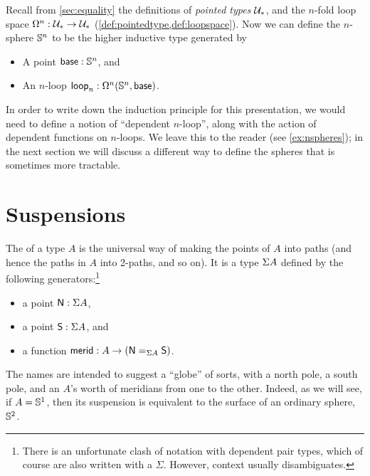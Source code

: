 %
Recall from \autoref{sec:equality} the definitions of \emph{pointed types} $\type_*$, and the $n$-fold loop space $\Omega^n : \type_* \to \type_*$
(\cref{def:pointedtype,def:loopspace}).  Now we can define the
$n$-sphere $\Sn^n$ to be the higher inductive type generated by
%
\begin{itemize}
\item A point $\base:\Sn^n$, and
\item An $n$-loop $\lloop_n : \Omega^n(\Sn^n,\base)$.
\end{itemize}
In order to write down the induction principle for this presentation, we would need to define a notion of ``dependent $n$-loop'', along with the action of dependent functions on $n$-loops.
We leave this to the reader (see \autoref{ex:nspheres}); in the next section we will discuss a different way to define the spheres that is sometimes more tractable.


\section{Suspensions}
\label{sec:suspension}

%
%
The  of a type $A$ is the universal way of making the points of $A$ into paths (and hence the paths in $A$ into 2-paths, and so on).
It is a type $\susp A$ defined by the following generators:\footnote{There is an unfortunate clash of notation with dependent pair types, which of course are also written with a $\Sigma$.
  However, context usually disambiguates.}
\begin{itemize}
\item a point $\north:\susp A$,
\item a point $\south:\susp A$, and
\item a function $\merid:A \to (\id[\susp A]\north\south)$.
\end{itemize}
The names are intended to suggest a ``globe'' of sorts, with a north pole, a south pole, and an $A$'s worth of meridians
%
%
from one to the other.
Indeed, as we will see, if $A=\Sn^1$, then its suspension is equivalent to the surface of an ordinary sphere, $\Sn^2$.

